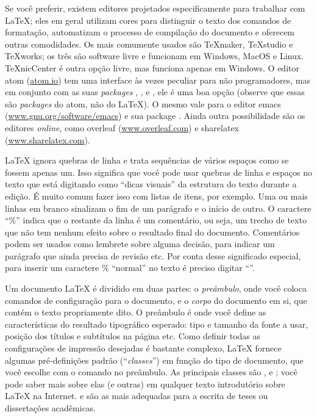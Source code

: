 Se você preferir, existem editores projetados especificamente para trabalhar
com \LaTeX{}; eles em geral utilizam cores para distinguir o texto dos
comandos de formatação, automatizam o processo de compilação do documento e
oferecem outras comodidades. Os mais comumente usados são \TeX{}maker,
\TeX{}studio e \TeX{}works; os três são software livre e funcionam em
Windows, MacOS e Linux. \TeX{}nicCenter é outra opção livre, mas funciona
apenas em Windows. O editor atom (\url{atom.io}) tem uma interface às vezes
peculiar para não programadores, mas em conjunto com as suas \emph{packages}
, ,
 e , ele é uma boa opção
(observe que essas são \emph{packages} do atom, não do \LaTeX{}). O mesmo
vale para o editor emacs (\url{www.gnu.org/software/emacs}) e sua package
. Ainda outra possibilidade são os editores \emph{online},
como overleaf (\url{www.overleaf.com}) e sharelatex (\url{www.sharelatex.com}).

\LaTeX{} ignora quebras de linha e trata sequências de vários espaços como
se fossem apenas um. Isso significa que você pode usar quebras de linha e
espaços no texto que está digitando como ``dicas visuais'' da estrutura do
texto durante a edição. É muito comum fazer isso com listas de itens, por
exemplo. Uma ou mais linhas em branco sinalizam o fim de um parágrafo e o
início de outro. O caractere ``\%'' indica que o restante da linha é um
comentário, ou seja, um trecho de texto que não tem nenhum efeito sobre o
resultado final do documento. Comentários podem ser usados como lembrete sobre
alguma decisão, para indicar um parágrafo que ainda precisa de revisão etc.
Por conta desse significado especial, para inserir um caractere \% ``normal''
no texto é preciso digitar ``\ltxcmd{\%}''.

Um documento \LaTeX{} é dividido em duas partes: o \emph{preâmbulo}, onde
você coloca comandos de configuração para o documento, e o \emph{corpo} do
documento em si, que contém o texto propriamente dito. O preâmbulo é onde
você define as características do resultado tipográfico esperado: tipo e
tamanho da fonte a usar, posição dos títulos e subtítulos na página etc.
Como definir todas as configurações de impressão desejadas é bastante complexo,
\LaTeX{} fornece algumas pré-definições padrão (``\emph{classes}'') em
função do tipo de documento, que você escolhe com o comando
 no preâmbulo. As principais classes
são ,  e ; você pode saber mais sobre elas
(e outras) em qualquer texto introdutório sobre \LaTeX{} na Internet.
 e  são as mais adequadas para a escrita de teses ou
dissertações acadêmicas.

